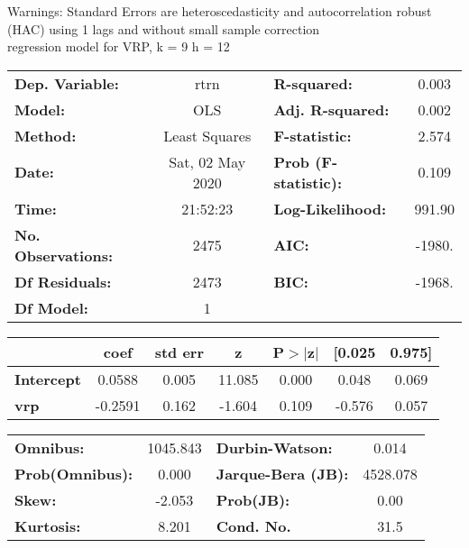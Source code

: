 Warnings: \newline
 [1] Standard Errors are heteroscedasticity and autocorrelation robust (HAC) using 1 lags and without small sample correction\\ 

regression model for VRP, k = 9 h = 12\begin{center}
\begin{tabular}{lclc}
\toprule
\textbf{Dep. Variable:}    &       rtrn       & \textbf{  R-squared:         } &     0.003   \\
\textbf{Model:}            &       OLS        & \textbf{  Adj. R-squared:    } &     0.002   \\
\textbf{Method:}           &  Least Squares   & \textbf{  F-statistic:       } &     2.574   \\
\textbf{Date:}             & Sat, 02 May 2020 & \textbf{  Prob (F-statistic):} &    0.109    \\
\textbf{Time:}             &     21:52:23     & \textbf{  Log-Likelihood:    } &    991.90   \\
\textbf{No. Observations:} &        2475      & \textbf{  AIC:               } &    -1980.   \\
\textbf{Df Residuals:}     &        2473      & \textbf{  BIC:               } &    -1968.   \\
\textbf{Df Model:}         &           1      & \textbf{                     } &             \\
\bottomrule
\end{tabular}
\begin{tabular}{lcccccc}
                   & \textbf{coef} & \textbf{std err} & \textbf{z} & \textbf{P$> |$z$|$} & \textbf{[0.025} & \textbf{0.975]}  \\
\midrule
\textbf{Intercept} &       0.0588  &        0.005     &    11.085  &         0.000        &        0.048    &        0.069     \\
\textbf{vrp}       &      -0.2591  &        0.162     &    -1.604  &         0.109        &       -0.576    &        0.057     \\
\bottomrule
\end{tabular}
\begin{tabular}{lclc}
\textbf{Omnibus:}       & 1045.843 & \textbf{  Durbin-Watson:     } &    0.014  \\
\textbf{Prob(Omnibus):} &   0.000  & \textbf{  Jarque-Bera (JB):  } & 4528.078  \\
\textbf{Skew:}          &  -2.053  & \textbf{  Prob(JB):          } &     0.00  \\
\textbf{Kurtosis:}      &   8.201  & \textbf{  Cond. No.          } &     31.5  \\
\bottomrule
\end{tabular}
\end{center}

